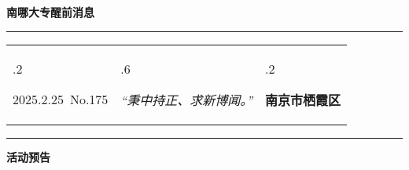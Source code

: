 \documentclass[letterpaper, 12pt]{article}
\begin{document}
\begin{center}
    \Huge\textbf{南哪大专醒前消息}
\end{center}
\vspace{4mm}
\hrule
\renewcommand\tabularxcolumn[1]{m{#1}}
\begin{tabularx}{\textwidth}{>{\hsize.2\hsize}X>{\hsize.6\hsize}X>{\hsize.2\hsize}X}
    \begin{flushleft}
        2025.2.25\, No.175
    \end{flushleft}
    &
    \begin{center}
        \textit{“秉中持正、求新博闻。”}
    \end{center}
    &
    \begin{flushright}
        \textbf{南京市栖霞区}
    \end{flushright}
\end{tabularx}
\vspace{-3.5mm}
\hrule
\vspace{4mm}
\centerline{\huge\textbf{活动预告}}
\end{document}
